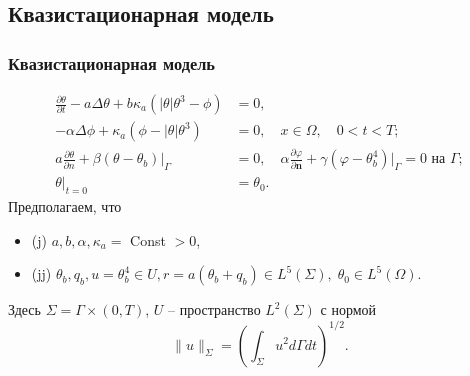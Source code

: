 \subsection{Квазистационарная модель}\label{subsec:qst}
\begin{frame}
    \frametitle{Квазистационарная модель}
    \begin{align}
        \frac{\partial\theta}{\partial t} - a\Delta\theta
        + b\kappa_a (|\theta|\theta^3 - \phi) &= 0, \label{eq:1_5:1}\\
        - \alpha\Delta\phi + \kappa_a (\phi - |\theta|\theta^3 ) &= 0,
        \quad x \in \Omega, \quad 0 < t < T ; \label{eq:1_5:1+} \\
        a \frac{\partial \theta}{\partial n}
        +\left.\beta\left(\theta-\theta_{b}\right)\right|_{\Gamma}&=0,
        \quad \alpha \frac{\partial \varphi}{\partial \mathbf{n}} + \gamma
        (\varphi-\theta_b^4)|_{\Gamma} = 0 \text{ на } \Gamma; \label{eq:1_5:2} \\
        \theta|_{t=0} &= \theta_0. \label{eq:1_5:3}
    \end{align}
    Предполагаем, что
    \begin {itemize}
        \item (j) $a, b, \alpha, \kappa_{a} =$ Const $>0$,
        \item (jj) $\theta_{b}, q_{b}, u=\theta^4_b \in U, r
        =a\left(\theta_{b}+q_{b}\right) \in L^{5}(\Sigma), \; \theta_{0} \in L^{5}(\Omega)$.
    \end{itemize}

    Здесь $\Sigma = \Gamma \times (0, T)$, $U$ -- пространство $L^{2}(\Sigma)$ с нормой
    \[
        \|u\|_{\Sigma}=\left(\int_{\Sigma} u^{2} d \Gamma d t\right)^{1/2}.
    \]
\end{frame}


